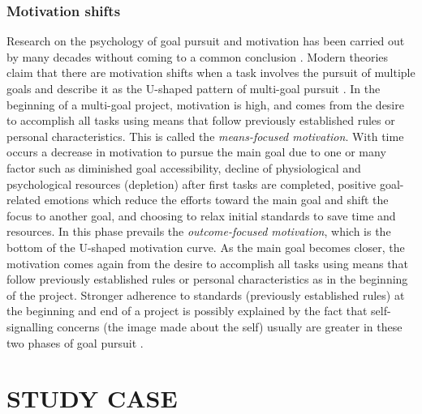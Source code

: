 \subsubsection{Motivation shifts}

Research on the psychology of goal pursuit and motivation has been carried out by many decades without coming 
to a common conclusion \cite{Toure-TilleryEtAl2011a, Hull1932}. Modern theories claim that there are motivation
shifts when a task involves the pursuit of multiple goals and describe it as the U-shaped pattern of multi-goal
pursuit \cite{BonezziEtAl2011, Toure-TilleryEtAl2011a}. In the beginning of a multi-goal project, motivation 
is high, and comes from the desire to accomplish all tasks using means that follow previously established rules 
or personal characteristics. This is called the \emph{means-focused motivation}. With time occurs a decrease 
in motivation to pursue the main goal due to one or many factor such as diminished goal accessibility, decline 
of physiological and psychological resources (depletion) after first tasks are completed, positive 
goal-related emotions which reduce the efforts toward the main goal and shift the focus to another goal, and 
choosing to relax initial standards to save time and resources. In this phase prevails the 
\emph{outcome-focused motivation}, which is the bottom of the U-shaped motivation curve. As the main goal 
becomes closer, the motivation comes again from the desire to accomplish all tasks using means that follow 
previously established rules or personal characteristics as in the beginning of the project. Stronger adherence 
to standards (previously established rules) at the beginning and end of a project is possibly explained by the 
fact that self-signalling concerns (the image made about the self) usually are greater in these two phases of 
goal pursuit \cite{Toure-TilleryEtAl2011}.

\section{STUDY CASE}

